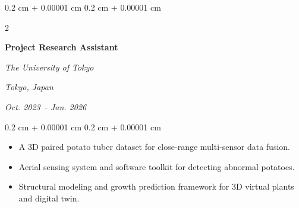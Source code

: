 \documentclass[10pt, a4paper]{article}
\newenvironment{highlights}{
    \begin{itemize}[
        topsep=0.10 cm,
        parsep=0.10 cm,
        partopsep=0pt,
        itemsep=0pt,
        leftmargin=0.4 cm + 10pt
    ]
}{
    \end{itemize}
} %
\newenvironment{onecolentry}{
    \begin{adjustwidth}{
        0.2 cm + 0.00001 cm
    }{
        0.2 cm + 0.00001 cm
    }
}{
    \end{adjustwidth}
} %
\newenvironment{twocolentry}[2][]{
    \onecolentry
    \def\secondColumn{#2}
    \setcolumnwidth{\fill, 4.5 cm}
    \begin{paracol}{2}
}{
    \switchcolumn \raggedleft \secondColumn
    \end{paracol}
    \endonecolentry
} %
\let\hrefWithoutArrow\href
\renewcommand{\href}[2]{\hrefWithoutArrow{#1}{\ifthenelse{\equal{#2}{}}{ }{#2 }\raisebox{.15ex}{\footnotesize \faExternalLink*}}}
\begin{document}
        \vspace{0.2 cm}

        
        \begin{twocolentry}{
            \textit{Tokyo, Japan}    
            
            \textit{Oct. 2023 – Jan. 2026}}
            \textbf{Project Research Assistant}
            
            \textit{The University of Tokyo}
        \end{twocolentry}

        \vspace{0.10 cm}
        \begin{onecolentry}
            \begin{highlights}
                \item A 3D paired potato tuber dataset for close-range multi-sensor data fusion.
                \item Aerial sensing system and software toolkit for detecting abnormal potatoes.
                \item Structural modeling and growth prediction framework for 3D virtual plants and digital twin.
            \end{highlights}
        \end{onecolentry}



            
            

\end{document}
